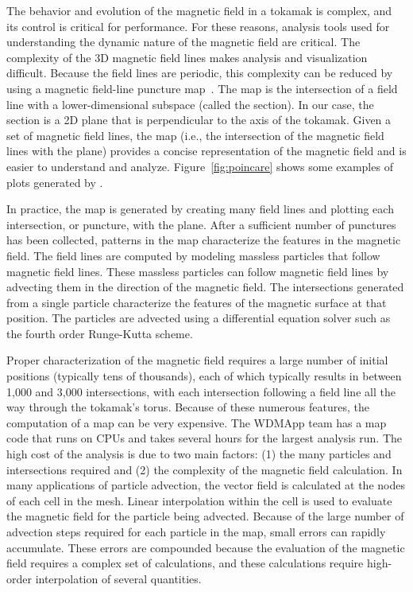 The behavior and evolution of the magnetic field in a tokamak is complex, and its control is critical for performance.
For these reasons, analysis tools used for understanding the dynamic nature of the magnetic field are critical.
The complexity of the 3D magnetic field lines makes analysis and visualization difficult.
Because the field lines are periodic, this complexity can be reduced by using a \poincare magnetic field-line puncture map~\citep{Sanderson2010}. 
The \poincare map is the intersection of a field line with a lower-dimensional subspace (called the \poincare section).
In our case, the \poincare section is a 2D plane that is perpendicular to the axis of the tokamak.
Given a set of magnetic field lines, the \poincare map (i.e., the intersection of the magnetic field lines with the plane) provides a concise 
representation of the magnetic field and is easier to understand and analyze.
Figure~\ref{fig:poincare} shows some examples of \poincare plots generated by \vtkm.

In practice, the \poincare map is generated by creating many field lines and plotting each intersection, or puncture, with the plane.
After a sufficient number of punctures has been collected, patterns in the map characterize the features in the magnetic field.
The field lines are computed by modeling massless particles that follow magnetic field lines.
These massless particles can follow magnetic field lines by advecting them in the direction of the magnetic field.
The intersections generated from a single particle characterize the features of the magnetic surface at that position.
The particles are advected using a differential equation solver such as the fourth order Runge-Kutta scheme.

Proper characterization of the magnetic field requires a large number of initial positions (typically tens of thousands), each of which typically results in between 1,000 and 3,000 intersections, with each intersection following a field line all the way through the tokamak's torus.
Because of these numerous features, the computation of a \poincare map can be very expensive.
The WDMApp team has a \poincare map code that runs on CPUs and takes several hours for the largest analysis run. 
The high cost of the analysis is due to two main factors: (1) the many particles and intersections required and (2) the complexity of the magnetic field calculation.  In many applications of particle advection, the vector field is calculated at the nodes of each cell in the mesh. Linear interpolation within the cell is used to evaluate the magnetic field for the particle being advected. Because of the large number of advection steps required for each particle in the \poincare map, small errors can rapidly accumulate. These errors are compounded because the evaluation of the magnetic field requires a complex set of calculations, and these calculations require high-order interpolation of several quantities.

